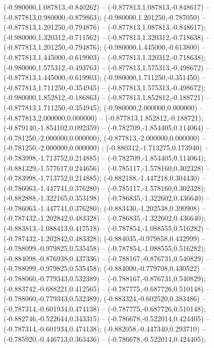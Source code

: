  (-0.980000,1.087813,-0.840262) -- (-0.877813,1.087813,-0.848617) -- (-0.877813,0.980000,-0.879863);
 (-0.980000,1.201250,-0.787050) -- (-0.877813,1.201250,-0.794876) -- (-0.877813,1.087813,-0.848617);
 (-0.980000,1.320312,-0.711562) -- (-0.877813,1.320312,-0.718638) -- (-0.877813,1.201250,-0.794876);
 (-0.980000,1.445000,-0.613800) -- (-0.877813,1.445000,-0.619903) -- (-0.877813,1.320312,-0.718638);
 (-0.980000,1.575312,-0.493763) -- (-0.877813,1.575313,-0.498672) -- (-0.877813,1.445000,-0.619903);
 (-0.980000,1.711250,-0.351450) -- (-0.877813,1.711250,-0.354945) -- (-0.877813,1.575313,-0.498672);
 (-0.980000,1.852812,-0.186863) -- (-0.877813,1.852812,-0.188721) -- (-0.877813,1.711250,-0.354945);
 (-0.980000,2.000000,0.000000) -- (-0.877813,2.000000,0.000000) -- (-0.877813,1.852812,-0.188721);
 (-0.879140,-1.854102,0.092359) -- (-0.782709,-1.854405,0.114064) -- (-0.781250,-2.000000,0.000000);
 (-0.877813,-2.000000,0.000000) -- (-0.781250,-2.000000,0.000000) ;
 (-0.880312,-1.713275,0.173940) -- (-0.783998,-1.713752,0.214885) -- (-0.782709,-1.854405,0.114064);
 (-0.881329,-1.577617,0.244656) -- (-0.785117,-1.578160,0.302328) -- (-0.783998,-1.713752,0.214885);
 (-0.882188,-1.447218,0.304430) -- (-0.786063,-1.447741,0.376280) -- (-0.785117,-1.578160,0.302328);
 (-0.882888,-1.322165,0.353198) -- (-0.786835,-1.322602,0.436640) -- (-0.786063,-1.447741,0.376280);
 (-0.883430,-1.202538,0.390908) -- (-0.787432,-1.202842,0.483328) -- (-0.786835,-1.322602,0.436640);
 (-0.883813,-1.088413,0.417518) -- (-0.787854,-1.088555,0.516282) -- (-0.787432,-1.202842,0.483328);
 (-0.884035,-0.979858,0.432999) -- (-0.788099,-0.979825,0.535458) -- (-0.787854,-1.088555,0.516282);
 (-0.884098,-0.876938,0.437336) -- (-0.788167,-0.876731,0.540829) -- (-0.788099,-0.979825,0.535458);
 (-0.884000,-0.779708,0.430522) -- (-0.788060,-0.779343,0.532389) -- (-0.788167,-0.876731,0.540829);
 (-0.883742,-0.688221,0.412565) -- (-0.787775,-0.687726,0.510148) -- (-0.788060,-0.779343,0.532389);
 (-0.883324,-0.602520,0.383486) -- (-0.787314,-0.601934,0.474138) -- (-0.787775,-0.687726,0.510148);
 (-0.882746,-0.522644,0.343315) -- (-0.786678,-0.522014,0.424405) -- (-0.787314,-0.601934,0.474138);
 (-0.882058,-0.447340,0.293710) -- (-0.785920,-0.446713,0.363436) -- (-0.786678,-0.522014,0.424405);
